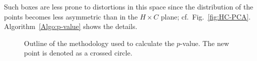 Such boxes are less prone to distortions in this space since the distribution of the points becomes less asymmetric than in the $H\times C$ plane; cf.\ Fig.~\ref{fig:HC-PCA}.
Algorithm~\ref{Algo:p-value} shows the details.

\begin{figure}[hbt]
	\centering
	\caption{Outline of the methodology used to calculate the $p$-value. The new point is denoted as a crossed circle.}
	\label{fig:methodologyPvalue}
\end{figure}

